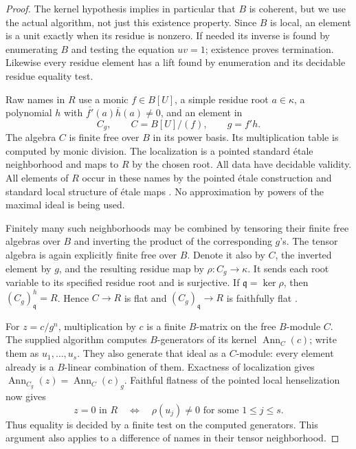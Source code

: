 \begin{proof}
The kernel hypothesis implies in particular
that $B$ is coherent, but we use the actual
algorithm, not just this existence property.
Since $B$ is local, an element is a unit
exactly when its residue is nonzero.
If needed its inverse is found by enumerating
$B$ and testing the equation $uv=1$;
existence proves termination.
Likewise every residue element has a lift
found by enumeration and its decidable
residue equality test.

Raw names in $R$ use a monic $f\in B[U]$,
a simple residue root $a\in\kappa$,
a polynomial $h$ with
$\overline{f'}(a)\overline h(a)\ne0$,
and an element in
\[
 C_g,\qquad C=B[U]/(f),\qquad g=f'h.                     \tag{C.3.NH2}
\]
The algebra $C$ is finite free over $B$
in its power basis.  Its multiplication
table is computed by monic division.
The localization is a pointed standard
\'etale neighborhood and maps to $R$
by the chosen root.
All data have decidable validity.
All elements of $R$ occur in these names
by the pointed \'etale construction and
standard local structure of \'etale maps
\cite[Lemma 10.155.1 and Proposition 10.144.4,
Tags 0BSK and 00UE]{C-StacksCoherentHenselizations}.
No approximation by powers of the maximal
ideal is being used.

Finitely many such neighborhoods may be
combined by tensoring their finite free
algebras over $B$ and inverting the product
of the corresponding $g$'s.
The tensor algebra is again explicitly
finite free over $B$.  Denote it also by
$C$, the inverted element by $g$, and
the resulting residue map by
$\rho:C_g\to\kappa$.
It sends each root variable to its
specified residue root and is surjective.
If $\mathfrak q=\ker\rho$, then
$(C_g)_{\mathfrak q}^h=R$.
Hence $C\to R$ is flat and
$(C_g)_{\mathfrak q}\to R$ is
faithfully flat
\cite[Section 10.155 and Lemma 15.46.1,
Tags 0BSK and 07QL]{C-StacksCoherentHenselizations}.

For $z=c/g^n$, multiplication by $c$
is a finite $B$-matrix on the free
$B$-module $C$.
The supplied algorithm computes
$B$-generators of its kernel
$\operatorname{Ann}_C(c)$; write them as
$u_1,\ldots,u_s$.
They also generate that ideal as
a $C$-module: every element already
is a $B$-linear combination of them.
Exactness of localization gives
$\operatorname{Ann}_{C_g}(z)
 =\operatorname{Ann}_C(c)_g$.
Faithful flatness of the pointed
local henselization now gives
\[
 z=0\text{ in }R
 \quad\Longleftrightarrow\quad
 \rho(u_j)\ne0\text{ for some }1\leq j\leq s.             \tag{C.3.NH3}
\]
Thus equality is decided by a finite
test on the computed generators.
This argument also applies to a
difference of names in their tensor
neighborhood.


\end{proof}
